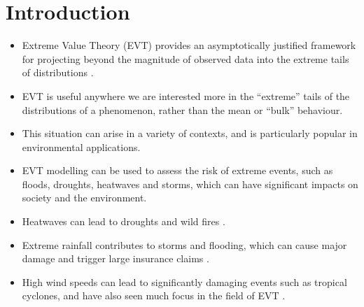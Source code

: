 \documentclass{article}
\numberwithin{equation}{section}
\begin{document}
\newpage

\tableofcontents

\newpage

\section{Introduction}\label{sec:intro}

\begin{itemize}
  \item Extreme Value Theory (EVT) provides an asymptotically justified framework for projecting beyond the magnitude of observed data into the extreme tails of distributions \citep{Coles2001}.
  \item EVT is useful anywhere we are interested more in the ``extreme'' tails of the distributions of a phenomenon, rather than the mean or ``bulk'' behaviour.
  \item This situation can arise in a variety of contexts, and is particularly popular in environmental applications.
  \item EVT modelling can be used to assess the risk of extreme events, such as floods, droughts, heatwaves and storms, which can have significant impacts on society and the environment.
  \item Heatwaves can lead to droughts and wild fires \citep{tanarhte2015heat, french2019quantifying, koh2023gradient}.
  \item Extreme rainfall contributes to storms and flooding, which can cause major damage and trigger large insurance claims \citep{Rohrbeck_flooding, osei2021estimation}.
  \item High wind speeds can lead to significantly damaging events such as tropical cyclones, and have also seen much focus in the field of EVT \citep{soukissian2015effect, steinkohl2013extreme}.
\end{itemize}

\vspace{1cm}
\end{document}
